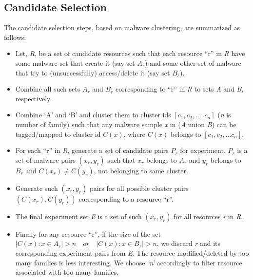 \subsection{Candidate Selection}
\label{sub:Candidate Selection}
The candidate selection steps, based on malware clustering, are summarized as follows:
\begin{itemize}
  \item Let, \emph{R}, be a set of candidate resources such that each resource ``r'' in \emph{R} have some malware set that create it (say set $A_r$) and some other set of malware that try to (unsuccessfully) access/delete it (say set $B_r$).
  \item Combine all such sets $A_r$ and $B_r$ corresponding to ``r'' in \emph{R} to sets \emph{A} and \emph{B}, respectively.
  \item Combine `A' and `B' and cluster them to cluster ids $[c_1,c_2,\ldots.\ c_n]$ (\emph{n} is number of family) such that any malware sample \emph{x} in (\emph{A} union \emph{B}) can be tagged/mapped to cluster id $C(x)$, where $C(x)$ belongs to $[c_1, c_2, \ldots c_n]$.
  \item For each ``r'' in \emph{R}, generate a set of candidate pairs $P_r$ for experiment. $P_r$ is a set of malware pairs $(x_r, y_r)$ such that $x_r$ belongs to $A_r$ and $y_r$ belongs to $B_r$ and $C(x_r) \neq C(y_r)$, not belonging to same cluster.
  \item Generate such $(x_r, y_r)$ pairs for all possible cluster pairs $(C(x_r), C(y_r))$ corresponding to a resource ``r''.
  \item The final experiment set \emph{E} is a set of such $(x_r, y_r)$ for all resources \emph{r} in \emph{R}.
  \item Finally for any resource ``r'', if the size of the set $| C(x) : x \in A_r | > n \quad or \quad | C(x) : x \in B_r | > n$, we discard \emph{r} and its corresponding experiment pairs from \emph{E}.
    The resource modified/deleted by too many families is less interesting.
    We choose \emph{`n'} accordingly to filter resource associated with too many families.
\end{itemize}
